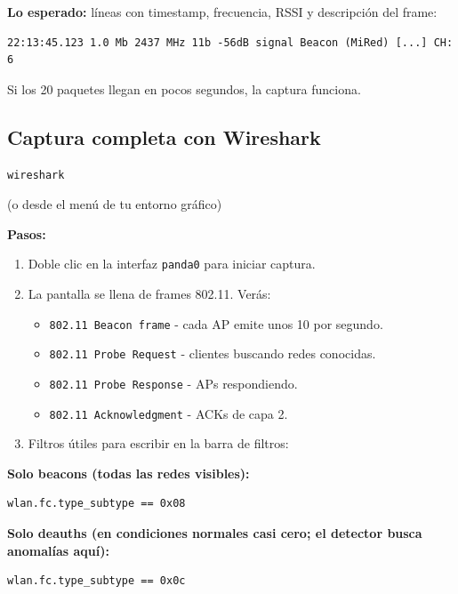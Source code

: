 \documentclass[11pt,a4paper]{article}
\begin{document}
\textbf{Lo esperado:} líneas con timestamp, frecuencia, RSSI y descripción
del frame:

\begin{lstlisting}
22:13:45.123 1.0 Mb 2437 MHz 11b -56dB signal Beacon (MiRed) [...] CH: 6
\end{lstlisting}

Si los 20 paquetes llegan en pocos segundos, la captura funciona.

\subsection{Captura completa con Wireshark}

\begin{lstlisting}
wireshark
\end{lstlisting}

(o desde el menú de tu entorno gráfico)

\textbf{Pasos:}

\begin{enumerate}
  \item Doble clic en la interfaz \texttt{panda0} para iniciar captura.
  \item La pantalla se llena de frames 802.11. Verás:
    \begin{itemize}
      \item \texttt{802.11 Beacon frame} - cada AP emite unos 10 por
        segundo.
      \item \texttt{802.11 Probe Request} - clientes buscando redes
        conocidas.
      \item \texttt{802.11 Probe Response} - APs respondiendo.
      \item \texttt{802.11 Acknowledgment} - ACKs de capa 2.
    \end{itemize}
  \item Filtros útiles para escribir en la barra de filtros:
\end{enumerate}

\textbf{Solo beacons (todas las redes visibles):}

\begin{lstlisting}
wlan.fc.type_subtype == 0x08
\end{lstlisting}

\textbf{Solo deauths (en condiciones normales casi cero; el detector
busca anomalías aquí):}

\begin{lstlisting}
wlan.fc.type_subtype == 0x0c
\end{lstlisting}
\end{document}
